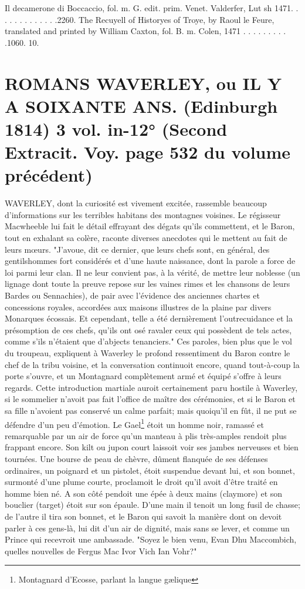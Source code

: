 \setcounter{page}{99}
Il decamerone di Boccaccio, fol. m.
G. edit. prim. Venet. Valderfer, Lut sh 1471. . . . . . . . . . . . .2260.
The Recuyell of Historyes of Troye, by Raoul le Feure, translated and printed by William Caxton, fol.
B. m. Colen, 1471 . . . . . . . . . .1060. 10.
\section{ROMANS \large{WAVERLEY, ou IL Y A SOIXANTE ANS. (Edinburgh 1814) 3 vol. in-12°} \small{(Second Extracit. Voy. page 532 du volume précédent)}}

WAVERLEY, dont la curiosité est vivement excitée, rassemble beaucoup d'informations sur les terribles habitans des montagnes voisines. Le régisseur Macwheeble lui fait le détail effrayant des dégats qu'ils commettent, et le Baron, tout en exhalant sa colère, raconte diverses anecdotes qui le mettent au fait de leurs mœurs. "J'avoue, dit ce dernier, que leurs chefs sont, en général, des gentilshommes fort considérés et d'une haute naissance, dont la parole a force de loi\setcounter{page}{100} parmi leur clan. Il ne leur convient pas, à la vérité, de mettre leur noblesse (un lignage dont toute la preuve repose sur les vaines rimes et les chansons de leurs Bardes ou Sennachies), de pair avec l'évidence des anciennes chartes et concessions royales, accordées aux maisons illustres de la plaine par divers Monarques écossais. Et cependant, telle a été dernièrement l'outrecuidance et la présomption de ces chefs, qu'ils ont osé ravaler ceux qui possèdent de tels actes, comme s'ils n'étaient que d'abjects tenanciers."
Ces paroles, bien plus que le vol du troupeau, expliquent à Waverley le profond ressentiment du Baron contre le chef de la tribu voisine, et la conversation continuoit encore, quand tout-à-coup la porte s'ouvre, et un Montagnard complètement armé et équipé s'offre à leurs regards. Cette introduction martiale auroit certainement paru hostile à Waverley, si le sommelier n'avoit pas fait l'office de maître des cérémonies, et si le Baron et sa fille n'avoient pas conservé un calme parfait; mais quoiqu'il en fût, il ne put se défendre d'un peu d'émotion. Le Gael\footnote{Montagnard d’Ecosse, parlant la langue gælique} étoit un homme noir, ramassé et\setcounter{page}{101} remarquable par un air de force qu'un manteau à plis très-amples rendoit plus frappant encore. Son kilt ou jupon court laissoit voir ses jambes nerveuses et bien tournées. Une bourse de peau de chèvre, dûment flanquée de ses défenses ordinaires, un poignard et un pistolet, étoit suspendue devant lui, et son bonnet, surmonté d'une plume courte, proclamoit le droit qu'il avoit d'être traité en homme bien né. A son côté pendoit une épée à deux mains (claymore) et son bouclier (target) étoit sur son épaule. D'une main il tenoit un long fusil de chasse; de l'autre il tira son bonnet, et le Baron qui savoit la manière dont on devoit parler à ces gens-là, lui dit d'un air de dignité, mais sans se lever, et comme un Prince qui recevroit une ambassade. "Soyez le bien venu, Evan Dhu Maccombich, quelles nouvelles de Fergus Mac Ivor Vich Ian Vohr?"
